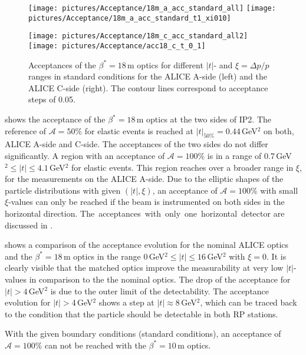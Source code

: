 \begin{figure}[b]
\begin{minipage}[t]{.5\textwidth}
\texttt{[image: pictures/Acceptance/18m\_a\_acc\_standard\_all]}
\texttt{[image: pictures/Acceptance/18m\_a\_acc\_standard\_t1\_xi010]}
\end{minipage}
\hfill
\begin{minipage}[t]{0.5\textwidth}
\centering
\texttt{[image: pictures/Acceptance/18m\_c\_acc\_standard\_all2]}
\texttt{[image: pictures/Acceptance/acc18\_c\_t\_0\_1]}
\end{minipage}
\caption{Acceptances of the $\beta^*=18\,$m optics for different $|t|$- and $\xi=\Delta p/p$ ranges in standard conditions for the ALICE A-side (left) and the ALICE C-side (right). The contour lines correspond to acceptance steps of 0.05.}
\label{fig:18m_acc_ac}
\end{figure}
 shows the acceptance of the $\beta^*=18\,$m optics at the two sides of IP2. The reference of $\mathcal{A}=50\%$ for elastic events is reached at $|t|_{50\%}=0.44\,$GeV$^2$ on both, ALICE A-side and C-side. The acceptances of the two sides do not differ significantly. A region with an acceptance of $\mathcal{A}=100\%$ is in a range of $0.7\,$GeV$^2 \leq |t| \leq 4.1\,$GeV$^2$ for elastic events. This region reaches over a broader range in $\xi$, for the measurements on the ALICE A-side. Due to the elliptic shapes of the particle distributions with given $(|t|,\xi)$, an acceptance of $\mathcal{A}=100\%$ with small \mbox{$\xi$-values} can only be reached if the beam is instrumented on both sides in the horizontal direction. \mbox{The acceptances with only one horizontal detector} are discussed in .


 shows a comparison of the acceptance evolution for the nominal ALICE optics and the $\beta^*=18\,$m optics in the range  $0\,$GeV$^2 \leq |t| \leq 16\,$GeV$^2$ with $\xi=0$. It is clearly visible that the matched optics improve the measurability at very low $|t|$-values in comparison to the the nominal optics. The drop of the acceptance for $|t|>4\,$GeV$^2$ is due to the outer limit of the detectability. The acceptance evolution for $|t|>$4$\,$GeV$^2$ shows a step at $|t| \approx 8\,$GeV$^2$, which can be traced back to the condition that the particle should be detectable in both RP stations.

With the given boundary conditions (standard conditions), an acceptance of $\mathcal{A}=100\%$ can not be reached with the $\beta^*=10\,$m optics.

